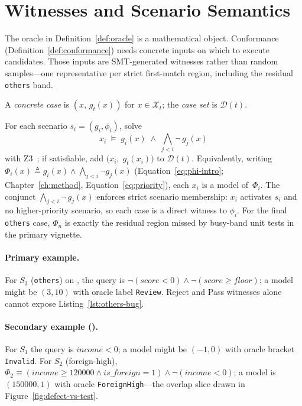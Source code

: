 \section{Witnesses and Scenario Semantics}
\label{sec:form:semantics}

The oracle in Definition~\ref{def:oracle} is a mathematical object.
Conformance (Definition~\ref{def:conformance}) needs concrete inputs on which
to execute candidates.
Those inputs are SMT-generated witnesses rather than random samples---one
representative per strict first-match region, including the residual
\texttt{others} band.

\begin{definition}
\label{def:concrete-case}
A \emph{concrete case} is $(x,\,g_t(x))$ for $x\in\mathcal{X}_t$;
the \emph{case set} is $\mathcal{D}(t)$.
\end{definition}

\begin{definition}
\label{def:test-suite}
For each scenario $s_i = (g_i, \phi_i)$, solve
\[
  x_i \;\models\; g_i(x) \;\land\; \bigwedge_{j < i} \neg\,g_j(x)
\]
with Z3~\citep{demoura2008z3, barrett2018smt}; if satisfiable, add
$\bigl(x_i,\;g_t(x_i)\bigr)$ to $\mathcal{D}(t)$.
Equivalently, writing
$\Phi_i(x) \triangleq g_i(x) \land \bigwedge_{j<i}\neg g_j(x)$
(Equation~\eqref{eq:phi-intro}; Chapter~\ref{ch:method},
Equation~\eqref{eq:priority}), each $x_i$ is a model of~$\Phi_i$.
The conjunct $\bigwedge_{j < i} \neg\,g_j(x)$ enforces strict scenario
membership: $x_i$ activates $s_i$ and no higher-priority scenario, so each
case is a direct witness to $\phi_i$.
For the final \texttt{others} case, $\Phi_n$ is exactly the residual region
missed by busy-band unit tests in the primary vignette.
\end{definition}

\paragraph{Primary example.}
For $S_3$ (\texttt{others}) on , the query is
$\neg(\mathit{score}<0)\land\neg(\mathit{score}\ge\mathit{floor})$; a model
might be $(3,10)$ with oracle label \texttt{Review}.
Reject and Pass witnesses alone cannot expose Listing~\ref{lst:others-bug}.

\paragraph{Secondary example ().}
For $S_1$ the query is $\mathit{income}<0$; a model might be $(-1,0)$ with
oracle bracket \texttt{Invalid}.
For $S_2$ (foreign-high),
$\Phi_2 \equiv (\mathit{income}{\ge}120000 \wedge \mathit{is\_foreign}{=}1)
\land \neg(\mathit{income}{<}0)$; a model is $(150000,1)$ with oracle
\texttt{ForeignHigh}---the overlap slice drawn in
Figure~\ref{fig:defect-vs-test}.

